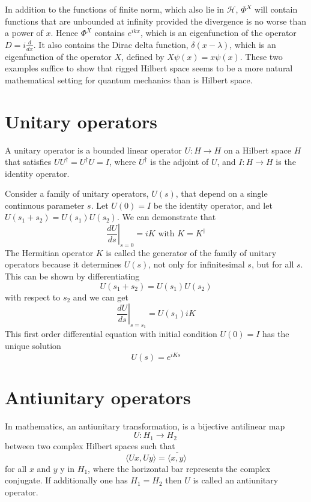 \documentclass[cyan]{elegantnote}
\begin{document}
In addition to the functions of finite norm, which also lie in $\mathcal{H}$, $\Phi^X$ will contain functions that are unbounded at infinity provided the divergence is no worse than a power of $x$. Hence $\Phi^X$ contains $e^{ikx}$, which is an eigenfunction
of the operator $D = i \frac{d}{dx}$. It also contains the Dirac delta function, $\delta(x-\lambda)$, which is an eigenfunction of the operator $X$, defined by $X\psi(x) = x\psi(x)$.
These two examples suffice to show that rigged Hilbert space seems to be a more natural mathematical setting for quantum mechanics than is Hilbert space.

\section{Unitary operators}
\begin{newdef}
 A unitary operator is a bounded linear operator $U: H\to H$ on a Hilbert space $H$ that satisfies $UU^{\dagger} = U^{\dagger}U =I$, where $U^{\dagger}$ is the adjoint of $U$, and $I: H \to H$ is the identity operator.
\end{newdef}
\noindent
Consider a family of unitary operators, $U(s)$, that depend on a single continuous parameter $s$. 
Let $U(0) = I $ be the identity operator, and let $U(s_1+s_2) = U(s_1)U(s_2)$.
We can demonstrate that
\[\left. \frac{dU}{ds}\right|_{s=0} = iK \mbox{ with } K = K^{\dagger}\]
The Hermitian operator $K$ is called the generator of the family of unitary operators because it determines $U(s)$, not only for infinitesimal $s$, but for all $s$. This can be shown by differentiating
\[U(s_1+s_2) = U(s_1)U(s_2)\]
with respect to $s_2$ and we can get
\[\left. \frac{dU}{ds}\right|_{s=s_1} = U(s_1)iK \]
This first order differential equation with initial condition $U(0) = I$ has the unique solution
\[U(s) = e^{iKs}\]

\section{Antiunitary operators}
\begin{newdef}
In mathematics, an antiunitary transformation, is a bijective antilinear map
\[U:H_{1}\to H_{2}\,\]
between two complex Hilbert spaces such that
\[\langle Ux,Uy\rangle ={\overline {\langle x,y\rangle }}\]
for all $x$ and $y$ y in $H_{1}$, where the horizontal bar represents the complex conjugate. If additionally one has $H_{1}=H_{2}$ then $U$ is called an antiunitary operator.
\end{newdef}
\end{document}
